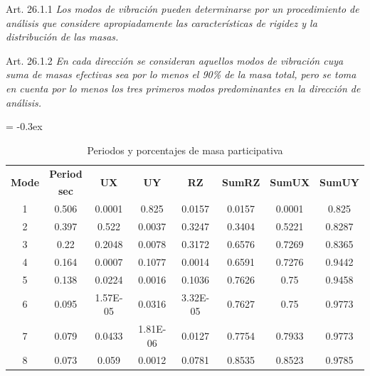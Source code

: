 \begin{mybox3}{Art. 26.1.1}
\textit{Los modos de vibración pueden determinarse por un procedimiento de análisis que considere apropiadamente las características de rigidez y la distribución de las masas.}
\end{mybox3}

\begin{mybox3}{Art. 26.1.2}
\textit{En cada dirección se consideran aquellos modos de vibración cuya suma de masas efectivas sea por lo menos el 90\% de la masa total, pero se toma en 
cuenta por lo menos los tres primeros modos predominantes en la dirección de 
análisis.}
\end{mybox3}

\begin{table}[h!]
  \centering
  \caption{Periodos y porcentajes de masa participativa}
    {
\extrarowheight = -0.3ex
\renewcommand{\arraystretch}{1.3}
    \begin{tabular}{|c|c|c|c|c|c|c|c|}
    \hline
    \multicolumn{1}{|c|}{\multirow{2}[4]{*}{\textbf{Mode}}} & \multicolumn{1}{c|}{\textbf{Period}} & \multicolumn{1}{c|}{\multirow{2}[4]{*}{\textbf{UX}}} & \multicolumn{1}{c|}{\multirow{2}[4]{*}{\textbf{UY}}} & \multicolumn{1}{c|}{\multirow{2}[4]{*}{\textbf{RZ}}} & \multicolumn{1}{c|}{\multirow{2}[4]{*}{\textbf{SumRZ}}} & \multicolumn{1}{c|}{\multirow{2}[4]{*}{\textbf{SumUX}}} & \multicolumn{1}{c|}{\multirow{2}[4]{*}{\textbf{SumUY}}} \\
\cline{2-2}          & \multicolumn{1}{c|}{\textbf{sec}} &       &       &       &       &       &  \\
    \hline
    1     & 0.506 & 0.0001 & 0.825 & 0.0157 & 0.0157 & 0.0001 & 0.825 \\
    \hline
    2     & 0.397 & 0.522 & 0.0037 & 0.3247 & 0.3404 & 0.5221 & 0.8287 \\
    \hline
    3     & 0.22  & 0.2048 & 0.0078 & 0.3172 & 0.6576 & 0.7269 & 0.8365 \\
    \hline
    4     & 0.164 & 0.0007 & 0.1077 & 0.0014 & 0.6591 & 0.7276 & 0.9442 \\
    \hline
    5     & 0.138 & 0.0224 & 0.0016 & 0.1036 & 0.7626 & 0.75  & 0.9458 \\
    \hline
    6     & 0.095 & 1.57E-05 & 0.0316 & 3.32E-05 & 0.7627 & 0.75  & 0.9773 \\
    \hline
    7     & 0.079 & 0.0433 & 1.81E-06 & 0.0127 & 0.7754 & 0.7933 & 0.9773 \\
    \hline
    8     & 0.073 & 0.059 & 0.0012 & 0.0781 & 0.8535 & 0.8523 & 0.9785 \\

\end{tabular}}
\end{table}
